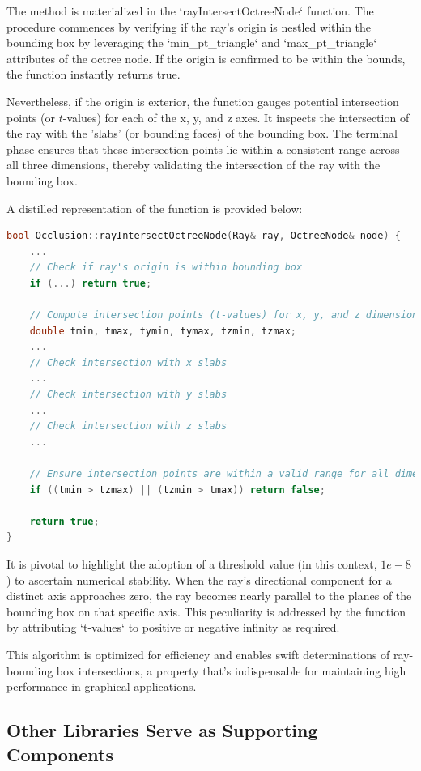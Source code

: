 \documentclass[11pt, a4paper,oneside,chapterprefix=false]{scrbook}
\begin{document}
The method is materialized in the `rayIntersectOctreeNode` function. The procedure commences by verifying if the ray's origin is nestled within the bounding box by leveraging the `min\_pt\_triangle` and `max\_pt\_triangle` attributes of the octree node. If the origin is confirmed to be within the bounds, the function instantly returns true.

Nevertheless, if the origin is exterior, the function gauges potential intersection points (or \( t \)-values) for each of the x, y, and z axes. It inspects the intersection of the ray with the 'slabs' (or bounding faces) of the bounding box. The terminal phase ensures that these intersection points lie within a consistent range across all three dimensions, thereby validating the intersection of the ray with the bounding box.

A distilled representation of the function is provided below:

\begin{lstlisting}[language=C++, caption=Simplified Ray Intersect Bounding Box]
bool Occlusion::rayIntersectOctreeNode(Ray& ray, OctreeNode& node) {
    ...
    // Check if ray's origin is within bounding box
    if (...) return true;
    
    // Compute intersection points (t-values) for x, y, and z dimensions
    double tmin, tmax, tymin, tymax, tzmin, tzmax;
    ...
    // Check intersection with x slabs
    ...
    // Check intersection with y slabs
    ...
    // Check intersection with z slabs
    ...

    // Ensure intersection points are within a valid range for all dimensions
    if ((tmin > tzmax) || (tzmin > tmax)) return false;
    
    return true;
}
\end{lstlisting}

It is pivotal to highlight the adoption of a threshold value (in this context, \(1e-8\)) to ascertain numerical stability. When the ray's directional component for a distinct axis approaches zero, the ray becomes nearly parallel to the planes of the bounding box on that specific axis. This peculiarity is addressed by the function by attributing `t-values` to positive or negative infinity as required.

This algorithm is optimized for efficiency and enables swift determinations of ray-bounding box intersections, a property that's indispensable for maintaining high performance in graphical applications.


\subsection{Other Libraries Serve as Supporting Components} \label{sec:supporting libraries}
\end{document}

